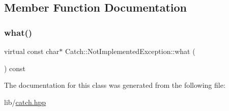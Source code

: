 \subsection{Member Function Documentation}
\hypertarget{class_catch_1_1_not_implemented_exception_ad4c13963f1a8feacda0cd331adda89e3}{}\label{class_catch_1_1_not_implemented_exception_ad4c13963f1a8feacda0cd331adda89e3} 
\subsubsection{\texorpdfstring{what()}{what()}}
{\footnotesize\ttfamily virtual const char$\ast$ Catch\+::\+Not\+Implemented\+Exception\+::what (\begin{DoxyParamCaption}{ }\end{DoxyParamCaption}) const\hspace{0.3cm}{\ttfamily [virtual]}}



The documentation for this class was generated from the following file\+:\begin{DoxyCompactItemize}
\item 
lib/\hyperlink{catch_8hpp}{catch.\+hpp}\end{DoxyCompactItemize}
